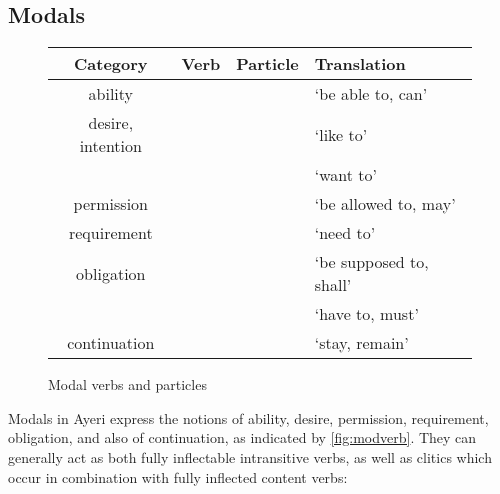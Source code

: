 \subsection{Modals}
\label{subsec:modals}

\begin{figure}
\caption{Modal verbs and particles}
\begin{tabu} to \linewidth {C[3] X[2] X[2] X[4]}
\tableheaderfont\toprule
Category
	& Verb
	& Particle
	& Translation
	\\
\toprule

ability
	&  
	&  
	& `be able to, can'
	\\
	
\midrule
	
desire, intention
	&  
	&  
	& `like to'
	\\
	
	&  
	&  
	& `want to'
	\\
	
\midrule

permission
	&  
	&  
	& `be allowed to, may'
	\\
	
\midrule

requirement
	&  
	&  
	& `need to'
	\\
	
\midrule

obligation
	&  
	&  
	& `be supposed to, shall'
	\\
	
	&  
	&  
	& `have to, must'
	\\
	
\midrule
	
continuation
	&  
	&  
	& `stay, remain'
	\\

\bottomrule
\end{tabu}
\label{fig:modverb}
\end{figure}

Modals in Ayeri express the notions of ability, desire, permission,
requirement, obligation, and also of continuation, as indicated by
\autoref{fig:modverb}. They can generally act as both fully inflectable
intransitive verbs, as well as clitics which occur in combination with fully
inflected content verbs:

